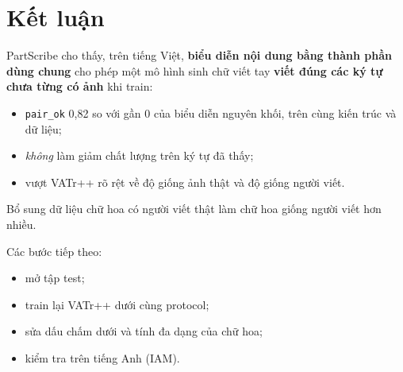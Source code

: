 \documentclass[11pt,a4paper]{article}
\newcommand{\pairok}{\texttt{pair\_ok}}
\begin{document}
\section{Kết luận}
PartScribe cho thấy, trên tiếng Việt, \textbf{biểu diễn nội dung bằng thành phần dùng chung} cho phép một mô hình sinh chữ viết tay \textbf{viết đúng các ký tự chưa từng có ảnh} khi train:
\begin{itemize}
\item \pairok{} 0,82 so với gần 0 của biểu diễn nguyên khối, trên cùng kiến trúc và dữ liệu;
\item \emph{không} làm giảm chất lượng trên ký tự đã thấy;
\item vượt VATr++ rõ rệt về độ giống ảnh thật và độ giống người viết.
\end{itemize}
Bổ sung dữ liệu chữ hoa có người viết thật làm chữ hoa giống người viết hơn nhiều.

Các bước tiếp theo:
\begin{itemize}
\item mở tập test;
\item train lại VATr++ dưới cùng protocol;
\item sửa dấu chấm dưới và tính đa dạng của chữ hoa;
\item kiểm tra trên tiếng Anh (IAM).
\end{itemize}
\end{document}
